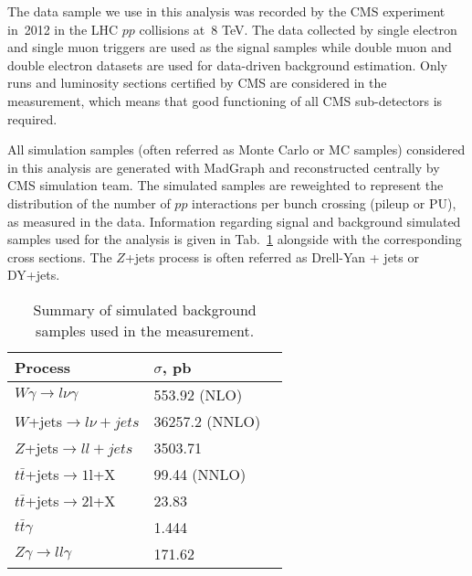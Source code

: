 The data sample we use in this analysis was recorded by the CMS experiment in~2012 in the LHC $pp$ collisions at~8 TeV. The data collected by single electron and single muon triggers are used as the signal samples while double muon and double electron datasets are used for data-driven background estimation. Only runs and luminosity sections certified by CMS are considered in the measurement, which means that good functioning of all CMS sub-detectors is required.

All simulation samples (often referred as Monte Carlo or MC samples) considered in this analysis are generated with MadGraph and reconstructed centrally by CMS simulation team. The simulated samples are reweighted to represent the distribution of the number of $pp$ interactions per bunch crossing (pileup or PU), as measured in the data. Information regarding signal and background simulated samples used for the analysis is given in Tab.~\ref{tab:mc_bkg_samples} alongside with the corresponding cross sections. The $Z$+jets process is often referred as Drell-Yan + jets or DY+jets.

\begin{table}[h]
  \small
  \begin{center}
    \caption{Summary of simulated background samples used in the measurement.}
    \begin{tabular}{|l|l|l|}
      \hline
      Process                      & $\sigma$, pb         \\ \hline
      $W\gamma \rightarrow l\nu\gamma$     & 553.92 (NLO)    \\ \hline
      $W$+jets$ \rightarrow l\nu + jets$          & 36257.2 (NNLO)  \\  \hline
      $Z$+jets$ \rightarrow ll + jets$            & 3503.71         \\ \hline
      $t\bar{t}$+jets$\rightarrow 1$l+X         & 99.44 (NNLO)   \\ \hline
      $t\bar{t}$+jets$\rightarrow 2$l+X         & 23.83         \\ \hline
      $t\bar{t}\gamma$                    & 1.444          \\ \hline
      $Z\gamma \rightarrow ll\gamma$       & 171.62           \\ \hline
    \end{tabular}
    \label{tab:mc_bkg_samples}
  \end{center}
\end{table} 

